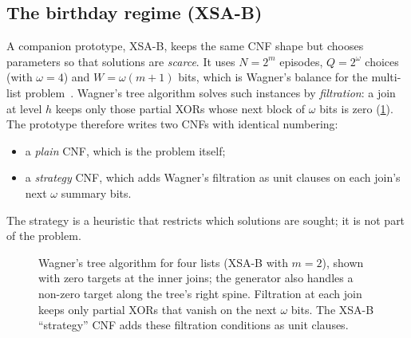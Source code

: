 \documentclass[11pt,a4paper]{article}
\newcommand{\XSAB}{\textsf{XSA-B}}
\begin{document}
\subsection{The birthday regime (\XSAB)}
\label{sec:xsab}
A companion prototype, \XSAB, keeps the same CNF shape but chooses parameters so that
solutions are \emph{scarce}. It uses $N=2^m$ episodes, $Q=2^\omega$ choices (with
$\omega=4$) and $W=\omega(m+1)$ bits, which is Wagner's balance for the multi-list
problem~\cite{wagner2002birthday}. Wagner's tree algorithm solves such instances by
\emph{filtration}: a join at level $h$ keeps only those partial XORs whose next block of
$\omega$ bits is zero (\cref{fig:xsab}). The prototype therefore writes two CNFs with
identical numbering:
\begin{itemize}
\item a \emph{plain} CNF, which is the problem itself;
\item a \emph{strategy} CNF, which adds Wagner's filtration as unit clauses on each join's
      next $\omega$ summary bits.
\end{itemize}
The strategy is a heuristic that restricts which solutions are sought; it is not part of
the problem.

\begin{figure}[htbp]
\centering
{}
\caption{Wagner's tree algorithm for four lists (\XSAB{} with $m=2$), shown with zero
targets at the inner joins; the generator also handles a non-zero target along the tree's
right spine. Filtration at each join keeps only partial XORs that vanish on the next $\omega$
bits. The \XSAB{} ``strategy'' CNF adds these filtration conditions as unit clauses.}
\label{fig:xsab}
\end{figure}
\end{document}
